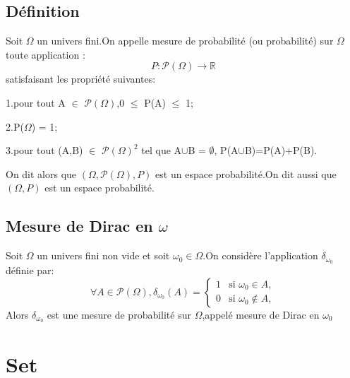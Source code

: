 \documentclass[12pt]{book}
\theoremstyle{definition}\newtheorem{dfn}{Définition}[chapter]
\theoremstyle{plain}\newtheorem{thm}{Théorème}[chapter]
\theoremstyle{plain}\newtheorem{prp}{Proposition}[chapter]
\theoremstyle{plain}\newtheorem{lem}{\bf Lemme}[chapter]
\theoremstyle{plain}\newtheorem{axm}{\bf Axiome}[chapter]
\theoremstyle{plain}\newtheorem{lmm}{\bf Lemme}[chapter]
\theoremstyle{plain}\newtheorem{exm}{\bf Example}[chapter]
\theoremstyle{plain}\newtheorem{cor}{\bf Corollaire}[chapter]
\theoremstyle{remark}\newtheorem{rem}{Remarque}[chapter]
\begin{document}
\subsection{Définition}
Soit $\varOmega$ un univers fini.On appelle mesure de probabilité (ou probabilité)
sur $\varOmega$ toute application :
\begin{equation*}
P:\mathcal{P(\varOmega)}\longrightarrow\mathbb{R}
\end{equation*}
satisfaisant les propriété suivantes:

1.pour tout A $\in$ $\mathcal{P(\varOmega)}$,0 $\leqslant$ P(A) $\leqslant$ 1;


2.P($\varOmega$) = 1;

3.pour tout (A,B) $\in$ $\mathcal{P(\varOmega)}^2$ tel que A$\cup$B = $\emptyset$, P(A$\cup  $B)=P(A)+P(B).

On dit alors que $(\varOmega,\mathcal{P(\varOmega)},P)$ est un espace probabilité.On dit aussi que $(\varOmega,P)$  est un espace probabilité.
\subsection{Mesure de Dirac en $\omega$}
Soit $\varOmega$ un univers fini non vide et soit $\omega_0 \in \varOmega$.On considère l'application $\delta_{\omega_0}$ définie par:
\begin{equation*}
\forall A \in \mathcal{P(\varOmega)},  \delta_{\omega_0}(A) = \begin{cases}
1 & \text{si }\omega_0 \in A ,\\
0 & \text{si }\omega_0 \notin A ,
\end{cases}
\end{equation*}
Alors $\delta_{\omega_0}$ est une mesure de probabilité sur $\varOmega$,appelé mesure de Dirac en $\omega_0$




\section{Set}
\end{document}
